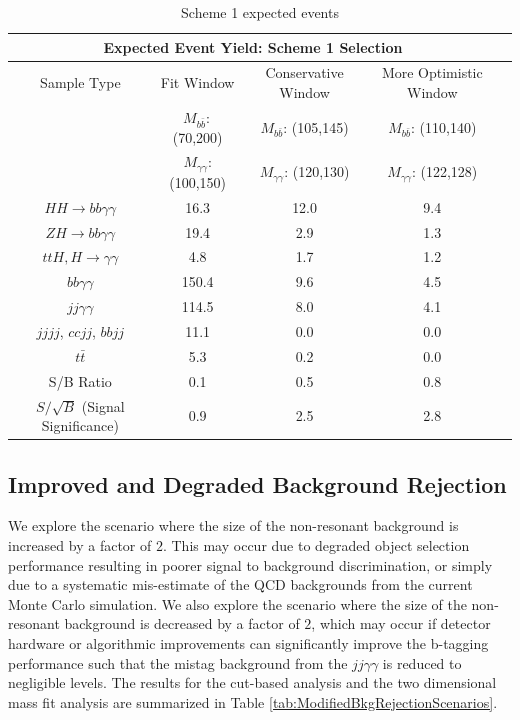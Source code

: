 \documentclass{cmspaper}
\begin{document}
\begin{table}[!ht]
\begin{center}
\begin{tabular}{|c|c|c|c|c|}
\hline
\multicolumn{4}{|c|}{\textbf{Expected Event Yield: Scheme 1 Selection}}                                 \\ \hline
Sample Type & Fit Window                    & Conservative Window           & More Optimistic Window    \\ 
            & $M_{b\bar{b}}:$ (70,200)      & $M_{b\bar{b}}$: (105,145)     & $M_{b\bar{b}}$: (110,140)      \\ 
            & $M_{\gamma\gamma}$: (100,150) & $M_{\gamma\gamma}$: (120,130) & $M_{\gamma\gamma}$: (122,128)  \\ 
\hline
$HH\rightarrow bb\gamma\gamma$     & 16.3     & 12.0     & 9.4       \\ \hline
$ZH\rightarrow bb \gamma\gamma$    & 19.4     & 2.9      & 1.3       \\ 
$ttH,H\rightarrow\gamma\gamma$     & 4.8      & 1.7      & 1.2       \\ 
$bb\gamma\gamma$                   & 150.4    & 9.6      & 4.5       \\ 
$jj\gamma\gamma$                   & 114.5    & 8.0      & 4.1       \\ 
$jjjj$, $ccjj$, $bbjj$             & 11.1     & 0.0      & 0.0       \\ 
$t\bar{t}$                         & 5.3      & 0.2      & 0.0       \\ \hline
S/B Ratio                          & 0.1      & 0.5      & 0.8       \\ \hline
$S/\sqrt{B}$ (Signal Significance) & 0.9      & 2.5      & 2.8       \\ \hline
\end{tabular}
\caption{Scheme 1 expected events}
\label{tab:scheme1PU140_events}
\end{center}
\end{table}

\subsection{Improved and Degraded Background Rejection}

We explore the scenario where the size of the non-resonant background is increased
by a factor of $2$. This may occur due to degraded object selection performance resulting
in poorer signal to background discrimination, or simply due to a systematic mis-estimate
of the QCD backgrounds from the current Monte Carlo simulation. We also explore the
scenario where the size of the non-resonant background is decreased by a factor of $2$,
which may occur if detector hardware or algorithmic improvements can significantly
improve the b-tagging performance such that the mistag background from the 
$jj\gamma\gamma$ is reduced to negligible levels. The results for the 
cut-based analysis and the two dimensional mass fit analysis are
summarized in Table \ref{tab:ModifiedBkgRejectionScenarios}.
\end{document}
